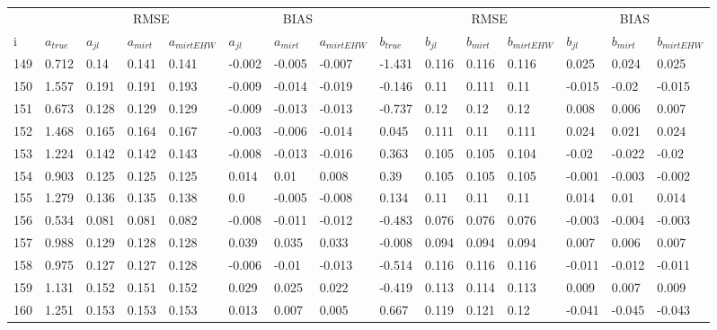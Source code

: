 \begin{table}
	\renewcommand{\arraystretch}{1}%
	\footnotesize
	\centering \begin{tabular}{|l|l|lll|lll|l|lll|lll}
		& &  \multicolumn{3}{c}{RMSE}& \multicolumn{3}{c}{BIAS}& & \multicolumn{3}{c}{RMSE}& \multicolumn{3}{c}{BIAS} \\
		i & $a_{true}$ & $a_{jl}$ & $a_{mirt}$ & $a_{mirt EHW}$ & $ a_{jl} $ & $ a_{mirt} $ & $ a_{mirt EHW} $ & $ b_{true} $ & $ b_{jl} $ & $ b_{mirt} $ & $ b_{mirt EHW} $ & $ b_{jl} $ & $b_{mirt}$ & $b_{mirt EHW}$\\
		\hline
		149 & 0.712 & 0.14 & 0.141 & 0.141 & -0.002 & -0.005 & -0.007 & -1.431 & 0.116 & 0.116 & 0.116 & 0.025 & 0.024 & 0.025 \\
		150 & 1.557 & 0.191 & 0.191 & 0.193 & -0.009 & -0.014 & -0.019 & -0.146 & 0.11 & 0.111 & 0.11 & -0.015 & -0.02 & -0.015 \\
		151 & 0.673 & 0.128 & 0.129 & 0.129 & -0.009 & -0.013 & -0.013 & -0.737 & 0.12 & 0.12 & 0.12 & 0.008 & 0.006 & 0.007 \\
		152 & 1.468 & 0.165 & 0.164 & 0.167 & -0.003 & -0.006 & -0.014 & 0.045 & 0.111 & 0.11 & 0.111 & 0.024 & 0.021 & 0.024 \\
		153 & 1.224 & 0.142 & 0.142 & 0.143 & -0.008 & -0.013 & -0.016 & 0.363 & 0.105 & 0.105 & 0.104 & -0.02 & -0.022 & -0.02 \\
		154 & 0.903 & 0.125 & 0.125 & 0.125 & 0.014 & 0.01 & 0.008 & 0.39 & 0.105 & 0.105 & 0.105 & -0.001 & -0.003 & -0.002 \\
		155 & 1.279 & 0.136 & 0.135 & 0.138 & 0.0 & -0.005 & -0.008 & 0.134 & 0.11 & 0.11 & 0.11 & 0.014 & 0.01 & 0.014 \\
		156 & 0.534 & 0.081 & 0.081 & 0.082 & -0.008 & -0.011 & -0.012 & -0.483 & 0.076 & 0.076 & 0.076 & -0.003 & -0.004 & -0.003 \\
		157 & 0.988 & 0.129 & 0.128 & 0.128 & 0.039 & 0.035 & 0.033 & -0.008 & 0.094 & 0.094 & 0.094 & 0.007 & 0.006 & 0.007 \\
		158 & 0.975 & 0.127 & 0.127 & 0.128 & -0.006 & -0.01 & -0.013 & -0.514 & 0.116 & 0.116 & 0.116 & -0.011 & -0.012 & -0.011 \\
		159 & 1.131 & 0.152 & 0.151 & 0.152 & 0.029 & 0.025 & 0.022 & -0.419 & 0.113 & 0.114 & 0.113 & 0.009 & 0.007 & 0.009 \\
		160 & 1.251 & 0.153 & 0.153 & 0.153 & 0.013 & 0.007 & 0.005 & 0.667 & 0.119 & 0.121 & 0.12 & -0.041 & -0.045 & -0.043 \\

\end{tabular}
\end{table}
